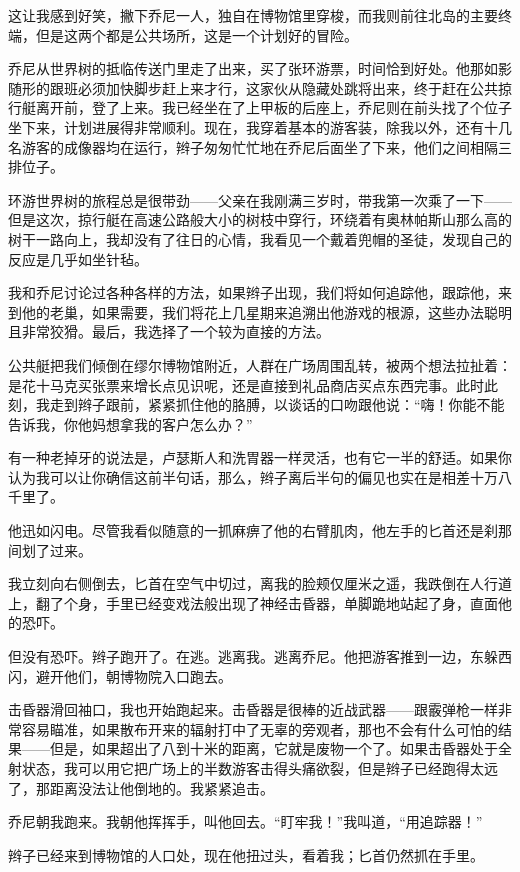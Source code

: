 \documentclass[AutoFakeBold=true]{book}
\begin{document}
这让我感到好笑，撇下乔尼一人，独自在博物馆里穿梭，而我则前往北岛的主要终端，但是这两个都是公共场所，这是一个计划好的冒险。

乔尼从世界树的抵临传送门里走了出来，买了张环游票，时间恰到好处。他那如影随形的跟班必须加快脚步赶上来才行，这家伙从隐藏处跳将出来，终于赶在公共掠行艇离开前，登了上来。我已经坐在了上甲板的后座上，乔尼则在前头找了个位子坐下来，计划进展得非常顺利。现在，我穿着基本的游客装，除我以外，还有十几名游客的成像器均在运行，辫子匆匆忙忙地在乔尼后面坐了下来，他们之间相隔三排位子。

环游世界树的旅程总是很带劲——父亲在我刚满三岁时，带我第一次乘了一下——但是这次，掠行艇在高速公路般大小的树枝中穿行，环绕着有奥林帕斯山那么高的树干一路向上，我却没有了往日的心情，我看见一个戴着兜帽的圣徒，发现自己的反应是几乎如坐针毡。

我和乔尼讨论过各种各样的方法，如果辫子出现，我们将如何追踪他，跟踪他，来到他的老巢，如果需要，我们将花上几星期来追溯出他游戏的根源，这些办法聪明且非常狡猾。最后，我选择了一个较为直接的方法。

公共艇把我们倾倒在缪尔博物馆附近，人群在广场周围乱转，被两个想法拉扯着：是花十马克买张票来增长点见识呢，还是直接到礼品商店买点东西完事。此时此刻，我走到辫子跟前，紧紧抓住他的胳膊，以谈话的口吻跟他说：``嗨！你能不能告诉我，你他妈想拿我的客户怎么办？''

有一种老掉牙的说法是，卢瑟斯人和洗胃器一样灵活，也有它一半的舒适。如果你认为我可以让你确信这前半句话，那么，辫子离后半句的偏见也实在是相差十万八千里了。

他迅如闪电。尽管我看似随意的一抓麻痹了他的右臂肌肉，他左手的匕首还是刹那间划了过来。

我立刻向右侧倒去，匕首在空气中切过，离我的脸颊仅厘米之遥，我跌倒在人行道上，翻了个身，手里已经变戏法般出现了神经击昏器，单脚跪地站起了身，直面他的恐吓。

但没有恐吓。辫子跑开了。在逃。逃离我。逃离乔尼。他把游客推到一边，东躲西闪，避开他们，朝博物院入口跑去。

击昏器滑回袖口，我也开始跑起来。击昏器是很棒的近战武器——跟霰弹枪一样非常容易瞄准，如果散布开来的辐射打中了无辜的旁观者，那也不会有什么可怕的结果——但是，如果超出了八到十米的距离，它就是废物一个了。如果击昏器处于全射状态，我可以用它把广场上的半数游客击得头痛欲裂，但是辫子已经跑得太远了，那距离没法让他倒地的。我紧紧追击。

乔尼朝我跑来。我朝他挥挥手，叫他回去。``盯牢我！''我叫道，``用追踪器！''

辫子已经来到博物馆的人口处，现在他扭过头，看着我；匕首仍然抓在手里。
\end{document}
